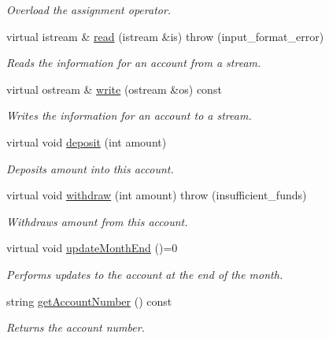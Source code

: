 \begin{CompactItemize}
\begin{CompactList}\small\item\em Overload the assignment operator. \item\end{CompactList}\item 
virtual istream \& \hyperlink{classAccount_1ef84736fe231b64547ba0b7824ac7c6}{read} (istream \&is)  throw (input\_\-format\_\-error)
\begin{CompactList}\small\item\em Reads the information for an account from a stream. \item\end{CompactList}\item 
virtual ostream \& \hyperlink{classAccount_65f80b996aecc07bcb5ddd31fcb0b063}{write} (ostream \&os) const 
\begin{CompactList}\small\item\em Writes the information for an account to a stream. \item\end{CompactList}\item 
virtual void \hyperlink{classAccount_d9f00408dc17914efb4fa4a3dadfd73f}{deposit} (int amount)
\begin{CompactList}\small\item\em Deposits {\em amount\/} into this account. \item\end{CompactList}\item 
virtual void \hyperlink{classAccount_d239379460e2b8975bc8472514768850}{withdraw} (int amount)  throw (insufficient\_\-funds)
\begin{CompactList}\small\item\em Withdraws {\em amount\/} from this account. \item\end{CompactList}\item 
\hypertarget{classAccount_3823d2d885625b78f83088946c257697}{
virtual void \hyperlink{classAccount_3823d2d885625b78f83088946c257697}{updateMonthEnd} ()=0}
\label{classAccount_3823d2d885625b78f83088946c257697}

\begin{CompactList}\small\item\em Performs updates to the account at the end of the month. \item\end{CompactList}\item 
string \hyperlink{classAccount_db8655dfb5f0d70eff938a414faaea31}{getAccountNumber} () const 
\begin{CompactList}\small\item\em Returns the account number. \item\end{CompactList}\end{CompactItemize}
